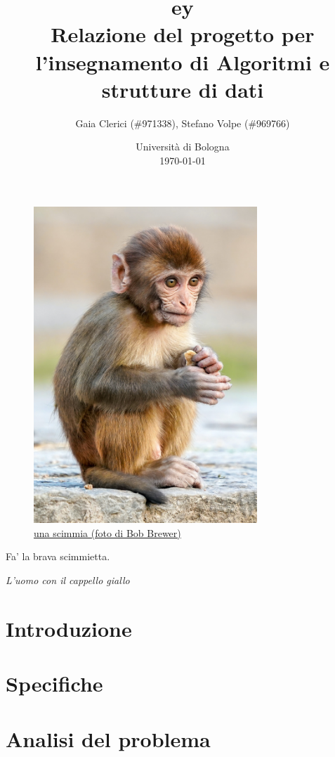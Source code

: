 \documentclass[a4paper]{article}
\title{
  {
    \fontspec[ Path = fonts/ ]{Symbola}
    \symbol{"1F17C}\symbol{"1F435}\symbol{"1F17D}\symbol{"1F17A}ey
  } \large \\
  \small Relazione del progetto per l'insegnamento di Algoritmi e strutture di
  dati
}
\author{
  Gaia Clerici (\#971338),
  Stefano Volpe (\#969766)
}
\date{
	Universit\`a di Bologna \\
  \today
}
\begin{document}
\maketitle

\begin{figure}[h]
  \includegraphics[width=0.75\textwidth]{monkey}
  \centering
  \caption{\href{https://unsplash.com/photos/daC7ji1EMHM}{una scimmia
  (foto di Bob Brewer)}}
\end{figure}

\pagebreak

\epigraph{Fa' la brava scimmietta.}{\textit{L'uomo con il cappello giallo}}

\tableofcontents

\section{Introduzione}

\section{Specifiche}

\section{Analisi del problema}
\end{document}
